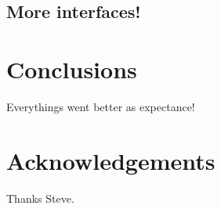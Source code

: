 \documentclass[final,3p,twocolumn]{elsarticle}
\begin{document}
%
%
%
%
%
%
%

\subsection{More interfaces!}
\label{subsec:more}

\section{Conclusions}
\label{sec:conclusion}

Everythings went better as expectance!

\section*{Acknowledgements}
\label{sec:acknowledgements}
Thanks Steve. 



\end{document}
